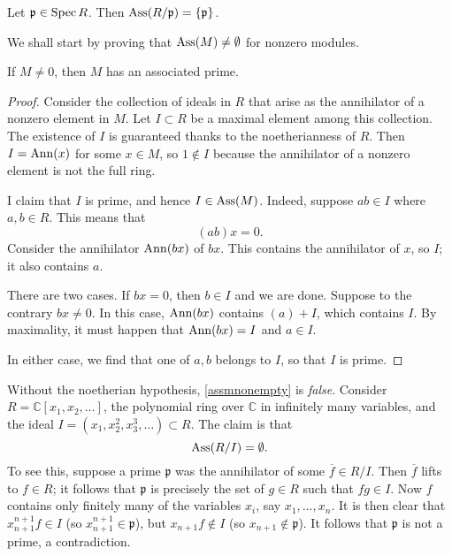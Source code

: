 \begin{exercise} 
Let $\mathfrak{p} \in \operatorname{Spec} R$. Then $\operatorname{Ass}(R/\mathfrak{p}) =
\left\{\mathfrak{p}\right\}$.
\end{exercise} 

We shall start by proving that $\operatorname{Ass}(M) \neq \emptyset$ for nonzero modules. 
\begin{proposition} \label{assmnonempty} 
If $M \neq 0$, then $M$ has an associated prime.
\end{proposition} 
\begin{proof}  Consider the collection of ideals in $R$ that arise as the
annihilator of a nonzero element in $M$. 
Let $I \subset R$ be a maximal element among this collection.  The existence of $I$ is guaranteed thanks to the noetherianness of
$R$.
Then $I = \operatorname{Ann}(x)$ for some $x \in M$, so  $1 \notin I$ because the annihilator of a nonzero element is not the full
ring.

I claim that
$I$ is prime,  and hence $I \in \operatorname{Ass}(M)$.  
Indeed, suppose $ab \in I$ where $a,b \in R$. This means that
\[ (ab)x = 0.  \]
Consider the annihilator $\operatorname{Ann}(bx)$ of $bx$. This contains the annihilator of $x$, so $I$;
it also contains $a$.

There are two cases. If $bx = 0$, then $ b \in I$ and we are done. Suppose to
the contrary $bx \neq 0$. In this case, $\operatorname{Ann}(bx)$ contains $(a) + I$, which
 contains $I$. By maximality, it must happen that $\operatorname{Ann}(bx) = I$ and $ a \in
 I$. 

 In either case, we find that one of $a,b $ belongs to $I$, so that $I$ is
 prime. 

\end{proof} 

\begin{example} 
Without the noetherian hypothesis, \cref{assmnonempty} is
\emph{false}. Consider $R = \mathbb{C}[x_1, x_2, \dots]$, the polynomial ring
over $\mathbb{C}$ in infinitely many variables, and the ideal $I = (x_1,
x_2^2, x_3^3, \dots) \subset R$.
The claim is that 
\[ \operatorname{Ass}(R/I ) = \emptyset.  \]
To see this, suppose a prime $\mathfrak{p}$ was the annihilator of some
$\overline{f}\in R/I$.  Then $\overline{f}$ lifts to $f \in R$; it follows
that $\mathfrak{p}$ is precisely the set of $g \in R$ such that $fg \in I$.
Now $f$ contains only finitely many of the variables $x_i$, say $x_1, \dots,
x_n$. It is then clear that $x_{n+1}^{n+1} f \in I$  (so $x_{n+1}^{n+1} \in
\mathfrak{p}$), but $x_{n+1} f \notin I$ (so $x_{n+1} \notin \mathfrak{p}$).
It follows that $\mathfrak{p}$ is not a prime, a contradiction.
\end{example} 

